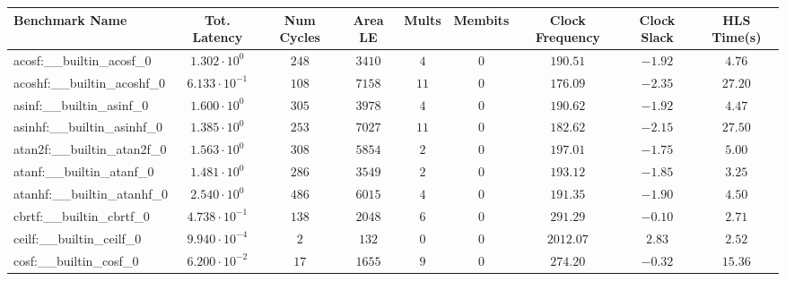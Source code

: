 \begin{tabular}{|l|c|c|c|c|c|c|c|c|}
\hline
Benchmark Name                            & Tot. Latency            & Num Cycles & Area LE    & Mults   & Membits & Clock Frequency & Clock Slack & HLS Time(s) \\
\hline
acosf:\_\_builtin\_acosf\_0               & $ 1.302 \cdot 10^{0}  $ & $ 248    $ & $ 3410   $ & $ 4   $ & $ 0   $ & $ 190.51      $ & $ -1.92   $ & $ 4.76    $ \\
acoshf:\_\_builtin\_acoshf\_0             & $ 6.133 \cdot 10^{-1} $ & $ 108    $ & $ 7158   $ & $ 11  $ & $ 0   $ & $ 176.09      $ & $ -2.35   $ & $ 27.20   $ \\
asinf:\_\_builtin\_asinf\_0               & $ 1.600 \cdot 10^{0}  $ & $ 305    $ & $ 3978   $ & $ 4   $ & $ 0   $ & $ 190.62      $ & $ -1.92   $ & $ 4.47    $ \\
asinhf:\_\_builtin\_asinhf\_0             & $ 1.385 \cdot 10^{0}  $ & $ 253    $ & $ 7027   $ & $ 11  $ & $ 0   $ & $ 182.62      $ & $ -2.15   $ & $ 27.50   $ \\
atan2f:\_\_builtin\_atan2f\_0             & $ 1.563 \cdot 10^{0}  $ & $ 308    $ & $ 5854   $ & $ 2   $ & $ 0   $ & $ 197.01      $ & $ -1.75   $ & $ 5.00    $ \\
atanf:\_\_builtin\_atanf\_0               & $ 1.481 \cdot 10^{0}  $ & $ 286    $ & $ 3549   $ & $ 2   $ & $ 0   $ & $ 193.12      $ & $ -1.85   $ & $ 3.25    $ \\
atanhf:\_\_builtin\_atanhf\_0             & $ 2.540 \cdot 10^{0}  $ & $ 486    $ & $ 6015   $ & $ 4   $ & $ 0   $ & $ 191.35      $ & $ -1.90   $ & $ 4.50    $ \\
cbrtf:\_\_builtin\_cbrtf\_0               & $ 4.738 \cdot 10^{-1} $ & $ 138    $ & $ 2048   $ & $ 6   $ & $ 0   $ & $ 291.29      $ & $ -0.10   $ & $ 2.71    $ \\
ceilf:\_\_builtin\_ceilf\_0               & $ 9.940 \cdot 10^{-4} $ & $ 2      $ & $ 132    $ & $ 0   $ & $ 0   $ & $ 2012.07     $ & $ 2.83    $ & $ 2.52    $ \\
cosf:\_\_builtin\_cosf\_0                 & $ 6.200 \cdot 10^{-2} $ & $ 17     $ & $ 1655   $ & $ 9   $ & $ 0   $ & $ 274.20      $ & $ -0.32   $ & $ 15.36   $ \\

\end{tabular}
